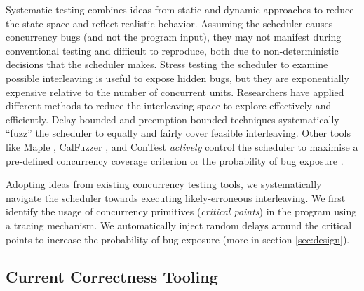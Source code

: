 %

Systematic testing combines ideas from static and dynamic approaches to reduce the state space and reflect realistic behavior.
%
Assuming the scheduler causes concurrency bugs (and not the program input), they may not manifest during conventional testing and difficult to reproduce, both due to non-deterministic decisions that the scheduler makes.
%
Stress testing the scheduler to examine possible interleaving is useful to expose hidden bugs, but they are exponentially expensive relative to the number of concurrent units.
%
Researchers have applied different methods \cite{thomson-concurrencyTesting-ppopp14} to reduce the interleaving space to explore effectively and efficiently.
%
Delay-bounded \cite{emmi-delayBounded-popl11,burckhardt-depthBug-asplos10} and preemption-bounded \cite{madanlal-preemptionBound-pldi07} techniques systematically ``fuzz'' the scheduler to equally and fairly cover feasible interleaving.
%
Other tools like Maple \cite{yu-maple-oopsla12}, CalFuzzer \cite{joshi-calfuzzer},  and ConTest \cite{contest-jgi01,edelstein2003contest} \textit{actively} control the scheduler to maximise a pre-defined concurrency coverage criterion \cite{hong-syncTesting-issta12} or the probability of bug exposure \cite{burckhardt-depthBug-asplos10}.

Adopting ideas from existing concurrency testing tools, we systematically navigate the scheduler towards executing likely-erroneous interleaving.
%
We first identify the usage of concurrency primitives (\textit{critical points}) in the program using a tracing mechanism.
%
We automatically inject random delays around the critical points to increase the probability of bug exposure (more in section \ref{sec:design}).



















\subsection{Current Correctness Tooling}

